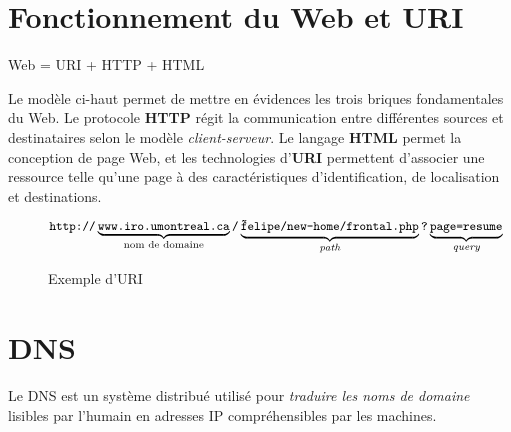 \documentclass[a4paper, 14pt]{report}
\begin{document}
        \section{Fonctionnement du Web et URI}
        \begin{center}
            \textsf{Web} = \textsf{URI} + \textsf{HTTP} + \textsf{HTML}        
        \end{center}
        Le modèle ci-haut permet de mettre en évidences les trois briques fondamentales du Web. 
        Le protocole \textbf{\uppercase{http}} régit la communication entre différentes sources et destinataires 
        selon le modèle \textit{client-serveur}. Le langage \textbf{\uppercase{html}}   permet la conception 
        de page Web, et les technologies d'\textbf{\uppercase{uri}} permettent d'associer une ressource telle qu'une page 
        à des caractéristiques d'identification, de localisation et destinations.

        

        \begin{figure}[H]
            \[
            \small
            \texttt{http://}\underbrace{\texttt{www.iro.umontreal.ca}}_{\text{nom de domaine}}%
            \texttt{/}\underbrace{\texttt{\~felipe/new-home/frontal.php}}_{\textit{path}}%
            \texttt{?}\underbrace{\texttt{page=resume}}_{\textit{query}}
            \] 
            \normalsize
            \caption{Exemple d'\uppercase{URI}}
        \end{figure}                        


    \section{DNS}
    Le \uppercase{DNS} est un système distribué 
        utilisé pour \textit{traduire les noms de domaine}  
        lisibles par l'humain 
        en adresses IP compréhensibles 
        par les machines. 
     
\end{document}
